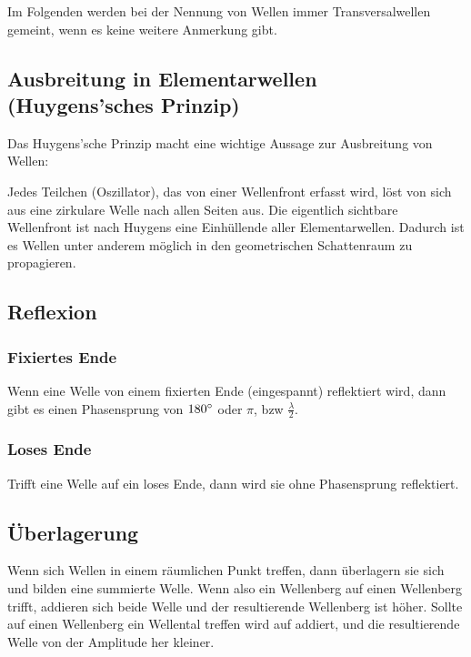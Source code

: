 Im Folgenden werden bei der Nennung von \glqq Wellen\grqq{} immer Transversalwellen gemeint, wenn es keine weitere Anmerkung gibt.  


\subsection[Ausbreitung in Elementarwellen]{Ausbreitung in Elementarwellen (Huygens'sches Prinzip)} \label{subsec:ausbreitung}

Das Huygens'sche Prinzip macht eine wichtige Aussage zur Ausbreitung von Wellen:

\glqq Jedes Teilchen (Oszillator), das von einer Wellenfront erfasst wird, löst von sich aus eine zirkulare Welle nach allen Seiten aus.\grqq{} Die eigentlich sichtbare Wellenfront ist nach Huygens eine Einhüllende aller \glqq Elementarwellen\grqq . Dadurch ist es Wellen unter anderem möglich in den geometrischen Schattenraum zu propagieren. 


\subsection{Reflexion}  \label{subsec:Reflexion}

	\subsubsection{Fixiertes Ende}
	
	Wenn eine Welle von einem fixierten Ende (eingespannt) reflektiert wird, dann gibt es einen Phasensprung von $180 \degree$ oder $\pi$, bzw $\frac{\lambda}{2}$.
	
	\subsubsection{Loses Ende}
	
	Trifft eine Welle auf ein loses Ende, dann wird sie ohne Phasensprung reflektiert.



\subsection{Überlagerung} \label{subsec:ueberlagerung}

Wenn sich Wellen in einem räumlichen Punkt treffen, dann überlagern sie sich und bilden eine summierte Welle. Wenn also ein Wellenberg auf einen Wellenberg trifft, addieren sich beide Welle und der resultierende Wellenberg ist höher. Sollte auf einen Wellenberg ein Wellental treffen wird auf addiert, und die resultierende Welle von der Amplitude her kleiner.

